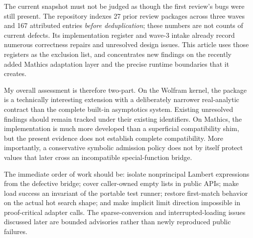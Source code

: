 \documentclass[11pt,letterpaper]{article}
\begin{document}
The current snapshot must not be judged as though the first review's bugs were still present. The repository indexes 27 prior review packages across three waves and 167 attributed entries \emph{before deduplication}; these numbers are not counts of current defects. Its implementation register and wave-3 intake already record numerous correctness repairs and unresolved design issues. This article uses those registers as the exclusion list, and concentrates new findings on the recently added Mathics adaptation layer and the precise runtime boundaries that it creates.~\cite{reviews,register,intake}

My overall assessment is therefore two-part. On the Wolfram kernel, the package is a technically interesting extension with a deliberately narrower real-analytic contract than the complete built-in asymptotics system. Existing unresolved findings should remain tracked under their existing identifiers. On Mathics, the implementation is much more developed than a superficial compatibility shim, but the present evidence does not establish complete compatibility. More importantly, a conservative symbolic admission policy does not by itself protect values that later cross an incompatible special-function bridge.

The immediate order of work should be: isolate nonprincipal Lambert expressions from the defective bridge; cover caller-owned empty lists in public APIs; make load success an invariant of the portable test runner; restore first-match behavior on the actual hot search shape; and make implicit limit direction impossible in proof-critical adapter calls. The sparse-conversion and interrupted-loading issues discussed later are bounded advisories rather than newly reproduced public failures.
\end{document}
